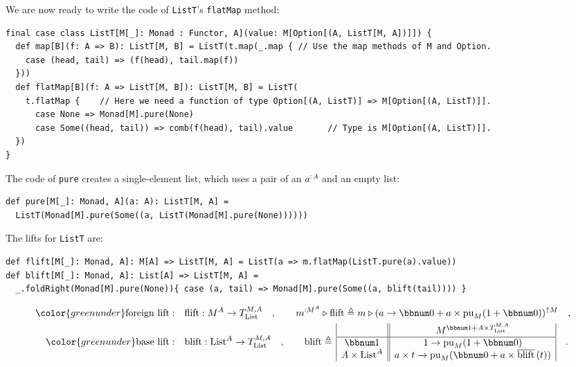 We are now ready to write the code of \lstinline!ListT!\textsf{'}s \lstinline!flatMap!
method:
\begin{lstlisting}
final case class ListT[M[_]: Monad : Functor, A](value: M[Option[(A, ListT[M, A])]]) {
  def map[B](f: A => B): ListT[M, B] = ListT(t.map(_.map { // Use the map methods of M and Option.
    case (head, tail) => (f(head), tail.map(f))
  }))
  def flatMap[B](f: A => ListT[M, B]): ListT[M, B] = ListT(
    t.flatMap {    // Here we need a function of type Option[(A, ListT)] => M[Option[(A, ListT)]].
      case None => Monad[M].pure(None)
      case Some((head, tail)) => comb(f(head), tail).value       // Type is M[Option[(A, ListT)]].
  })
}
\end{lstlisting}
The code of \lstinline!pure! creates a single-element list, which
uses a pair of an $a^{:A}$ and an empty list:
\begin{lstlisting}
def pure[M[_]: Monad, A](a: A): ListT[M, A] =
  ListT(Monad[M].pure(Some((a, ListT(Monad[M].pure(None))))))
\end{lstlisting}
The lifts for \lstinline!ListT! are:
\begin{lstlisting}
def flift[M[_]: Monad, A]: M[A] => ListT[M, A] = ListT(a => m.flatMap(ListT.pure(a).value))
def blift[M[_]: Monad, A]: List[A] => ListT[M, A] =
  _.foldRight(Monad[M].pure(None)){ case (a, tail) => Monad[M].pure(Some((a, blift(tail)))) }
\end{lstlisting}
\begin{align*}
{\color{greenunder}\text{foreign lift}:}\quad & \text{flift}:M^{A}\rightarrow T_{\text{List}}^{M,A}\quad,\quad\quad m^{:M^{A}}\triangleright\text{flift}\triangleq m\triangleright(a\rightarrow\bbnum 0+a\times\text{pu}_{M}(1+\bbnum 0))^{\uparrow M}\quad,\\
{\color{greenunder}\text{base lift}:}\quad & \text{blift}:\text{List}^{A}\rightarrow T_{\text{List}}^{M,A}\quad,\quad\quad\text{blift}\triangleq\,\begin{array}{|c||c|}
 & M^{\bbnum 1+A\times T_{\text{List}}^{M,A}}\\
\hline \bbnum 1 & 1\rightarrow\text{pu}_{M}(1+\bbnum 0)\\
A\times\text{List}^{A} & a\times t\rightarrow\text{pu}_{M}(\bbnum 0+a\times\overline{\text{blift}}\,(t))
\end{array}\quad.
\end{align*}

